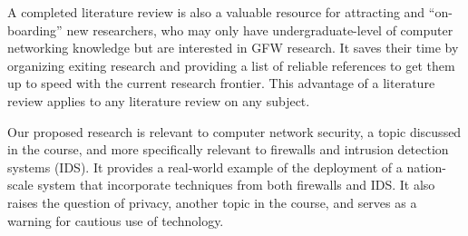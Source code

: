 \documentclass{article}
\begin{document}
A completed literature review is also a valuable resource for attracting and ``on-boarding'' new researchers, who may only have undergraduate-level of computer networking knowledge but are interested in GFW research. It saves their time by organizing exiting research and providing a list of reliable references to get them up to speed with the current research frontier. This advantage of a literature review applies to any literature review on any subject.

Our proposed research is relevant to computer network security, a topic discussed in the course, and more specifically relevant to firewalls and intrusion detection systems (IDS). It provides a real-world example of the deployment of a nation-scale system that incorporate techniques from both firewalls and IDS. It also raises the question of privacy, another topic in the course, and serves as a warning for cautious use of technology.

\printbibliography
\end{document}

